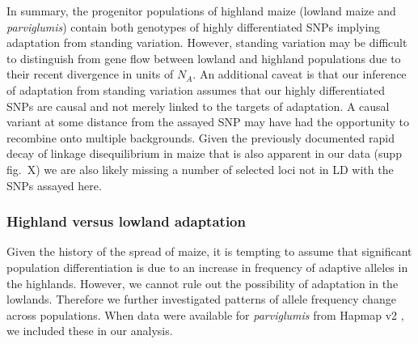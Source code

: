 {{In summary, the progenitor populations of highland maize (lowland maize and \emph{parviglumis}) contain both genotypes of highly differentiated SNPs implying adaptation from standing variation.
However, standing variation may be difficult to distinguish from gene flow between lowland and highland populations due to their recent divergence in units of $N_A$.
An additional caveat is that our inference of adaptation from standing variation assumes that our highly differentiated SNPs are causal and not merely linked to the targets of adaptation.  A causal variant at some distance from the assayed SNP may have had the opportunity to recombine onto multiple backgrounds. 
Given the previously documented rapid decay of linkage disequilibrium in maize \cite[]{Tenaillon_2001_11470895,Remington_2001_11562485} that is also apparent in our data (supp fig.~X) we are also likely missing a number of selected loci not in LD with the SNPs assayed here.



\subsubsection{Highland versus lowland adaptation}

Given the history of the spread of maize, it is tempting to assume that significant population differentiation is due to an increase in frequency of adaptive alleles in the highlands.
However, we cannot rule out the possibility of adaptation in the lowlands.
Therefore we further investigated patterns of allele frequency change across populations.
When data were available for \emph{parviglumis} from Hapmap v2 \cite[]{Chia_2012_22660545,Hufford_2012_22660546}, we included these in our analysis.

}}

